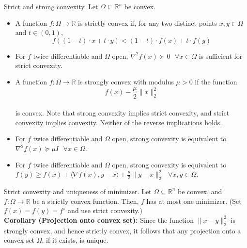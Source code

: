 \begin{definition}[L4.2]{Strict and strong convexity.}
    Let $\Omega \subseteq \mathbb{R}^n$ be convex.
    \begin{itemize}[leftmargin=*]
        \item A function $f: \Omega \rightarrow \mathbb{R}$ is strictly convex if, for any two distinct points $x, y \in \Omega$ and $t \in(0,1)$,
        \vspace{-4pt}\\
        $$
        f((1-t) \cdot x+t \cdot y)<(1-t) \cdot f(x)+t \cdot f(y)
        $$
        \vspace{-10pt}
        \item For $f$ twice differentiable and $\Omega$ open, $\nabla^2 f(x) \succ 0 \text{ } \forall x \in \Omega$  is sufficient for strict convexity.
        \item A function $f: \Omega \rightarrow \mathbb{R}$ is strongly convex with modulus $\mu>0$ if the function
        \vspace{-5pt}\\
        $$
        f(x)-\frac{\mu}{2}\|x\|_2^2
        $$
        \vspace{-5pt}\\
        is convex.
        Note that strong convexity implies strict convexity, and strict convexity implies convexity. Neither of the reverse implications holds.
        \item For $f$ twice differentiable and $\Omega$ open, strong convexity is equivalent to $\nabla^2 f(x) \succeq \mu I \text{ } \forall x \in \Omega$. 
        \item For $f$ twice differentiable and $\Omega$ open, strong convexity is equivalent to $f(y) \geq f(x) + \langle \nabla f(x), y-x\rangle + \frac{\mu}{2}\|y-x\|_2^2 \text{ } \forall x,y\in\Omega$.
    \end{itemize}
\end{definition}

\begin{theorem}[L4.5]{Strict convexity and uniqueness of minimizer.}
    Let $\Omega \subseteq \mathbb{R}^n$ be convex, and $f: \Omega \rightarrow \mathbb{R}$ be a strictly convex function. Then, $f$ has at most one minimizer.
    (Set $f(x)=f(y)=f^\star$ and use strict convexity.)\\
    \textbf{Corollary (Projection onto convex set):} Since the function $\|x-y\|_2^2$ is strongly convex, and hence strictly convex, it follows that any projection onto a convex set $\Omega$, if it exists, is unique.
\end{theorem}

